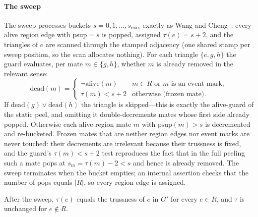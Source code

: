 \paragraph{The sweep}
The sweep processes buckets $s=0,1,\dots,s_{\max}$ exactly as Wang and Cheng~\cite{wang2012truss}: every alive region edge with $\mathrm{psup}=s$ is popped, assigned $\tau(e)=s+2$, and the triangles of $e$ are scanned through the stamped adjacency (one shared stamp per sweep position, so the scan allocates nothing).
For each triangle $\{e,g,h\}$ the guard evaluates, per mate $m\in\{g,h\}$, whether $m$ is already removed in the relevant sense:
\[
\mathrm{dead}(m)=
\begin{cases}
\neg\mathrm{alive}(m) & m\in R \text{ or } m \text{ is an event mark},\\
\tau(m) < s+2 & \text{otherwise (frozen mate).}
\end{cases}
\]
If $\mathrm{dead}(g)\vee\mathrm{dead}(h)$ the triangle is skipped---this is exactly the alive-guard of the static peel, and omitting it double-decrements mates whose first side already popped.
Otherwise each alive region mate $m$ with $\mathrm{psup}(m)>s$ is decremented and re-bucketed.
Frozen mates that are neither region edges nor event marks are never touched: their decrements are irrelevant because their trussness is fixed, and the guard's $\tau(m)<s+2$ test reproduces the fact that in the full peeling such a mate pops at $s_m=\tau(m)-2<s$ and hence is already removed.
The sweep terminates when the bucket empties; an internal assertion checks that the number of pops equals $|R|$, so every region edge is assigned.

\begin{theorem}[Exactness]
\label{thm:exact}
After the sweep, $\tau(e)$ equals the trussness of $e$ in $G'$ for every $e\in R$, and $\tau$ is unchanged for $e\notin R$.
\end{theorem}

